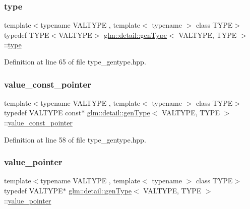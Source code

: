 \subsubsection{\texorpdfstring{type}{type}}
{\footnotesize\ttfamily template$<$typename V\+A\+L\+T\+Y\+PE , template$<$ typename $>$ class T\+Y\+PE$>$ \\
typedef T\+Y\+PE$<$V\+A\+L\+T\+Y\+PE$>$ \hyperlink{structglm_1_1detail_1_1gen_type}{glm\+::detail\+::gen\+Type}$<$ V\+A\+L\+T\+Y\+PE, T\+Y\+PE $>$\+::\hyperlink{structglm_1_1detail_1_1gen_type_a17dbd44c7a86d09e6ea05b72cb02bccf}{type}}



Definition at line 65 of file type\+\_\+gentype.\+hpp.

\mbox{\label{structglm_1_1detail_1_1gen_type_a34e169ae6d50e1c76574c850eae2c7fc}} 
\subsubsection{\texorpdfstring{value\+\_\+const\+\_\+pointer}{value\_const\_pointer}}
{\footnotesize\ttfamily template$<$typename V\+A\+L\+T\+Y\+PE , template$<$ typename $>$ class T\+Y\+PE$>$ \\
typedef V\+A\+L\+T\+Y\+PE const$\ast$ \hyperlink{structglm_1_1detail_1_1gen_type}{glm\+::detail\+::gen\+Type}$<$ V\+A\+L\+T\+Y\+PE, T\+Y\+PE $>$\+::\hyperlink{structglm_1_1detail_1_1gen_type_a34e169ae6d50e1c76574c850eae2c7fc}{value\+\_\+const\+\_\+pointer}}



Definition at line 58 of file type\+\_\+gentype.\+hpp.

\mbox{\label{structglm_1_1detail_1_1gen_type_a3b272e7be29ab920f2877c00646f6f9b}} 
\subsubsection{\texorpdfstring{value\+\_\+pointer}{value\_pointer}}
{\footnotesize\ttfamily template$<$typename V\+A\+L\+T\+Y\+PE , template$<$ typename $>$ class T\+Y\+PE$>$ \\
typedef V\+A\+L\+T\+Y\+PE$\ast$ \hyperlink{structglm_1_1detail_1_1gen_type}{glm\+::detail\+::gen\+Type}$<$ V\+A\+L\+T\+Y\+PE, T\+Y\+PE $>$\+::\hyperlink{structglm_1_1detail_1_1gen_type_a3b272e7be29ab920f2877c00646f6f9b}{value\+\_\+pointer}}



